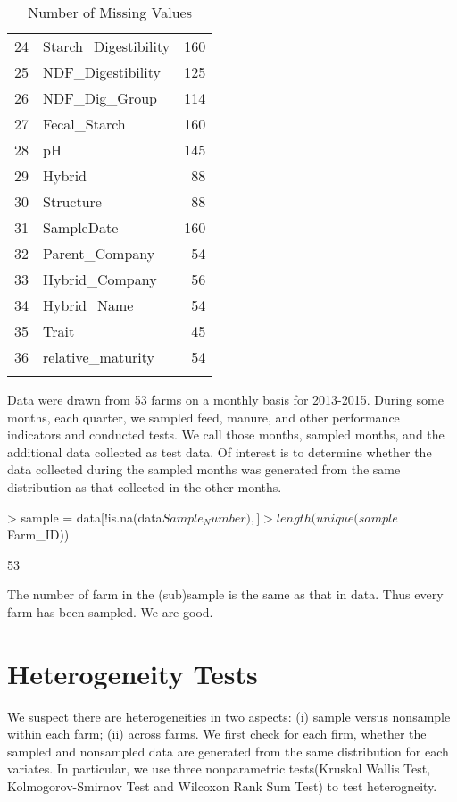 \documentclass[12pt,]{article}
\begin{document}
\begin{Schunk}
\begin{longtable}{ll|r}
  24 & Starch\_Digestibility & 160 \\ 
  25 & NDF\_Digestibility & 125 \\ 
  26 & NDF\_Dig\_Group & 114 \\ 
  27 & Fecal\_Starch & 160 \\ 
  28 & pH & 145 \\ 
  29 & Hybrid &  88 \\ 
  30 & Structure &  88 \\ 
  31 & SampleDate & 160 \\ 
  32 & Parent\_Company &  54 \\ 
  33 & Hybrid\_Company &  56 \\ 
  34 & Hybrid\_Name &  54 \\ 
  35 & Trait &  45 \\ 
  36 & relative\_maturity &  54 \\ 
   \hline
\hline
\caption{Number of Missing Values} 
\label{Table-1}
\end{longtable}\end{Schunk}

Data were drawn from 53 farms on a monthly basis for 2013-2015. During some months, each quarter, we sampled feed, manure, and other performance indicators and conducted tests. We call those months, sampled months, and the additional data collected as test data. Of interest is to determine whether the data collected during the sampled months was generated from the same distribution as that collected in the other months.


\begin{Schunk}
\begin{Sinput}
> sample = data[!is.na(data$Sample_Number), ]
> length(unique(sample$Farm_ID))
\end{Sinput}
\begin{Soutput}
[1] 53
\end{Soutput}
\end{Schunk}
The number of farm in the (sub)sample is the same as that in data. Thus every farm has been sampled. We are good.
 
\section{Heterogeneity Tests}
We suspect there are heterogeneities in two aspects: (i) sample versus nonsample within each farm; (ii) across farms. We first check for each firm, whether the sampled and nonsampled data are generated from the same distribution for each variates. In particular, we use three nonparametric tests(Kruskal Wallis Test, Kolmogorov-Smirnov Test and Wilcoxon Rank Sum Test) to test  heterogneity.
\end{document}
